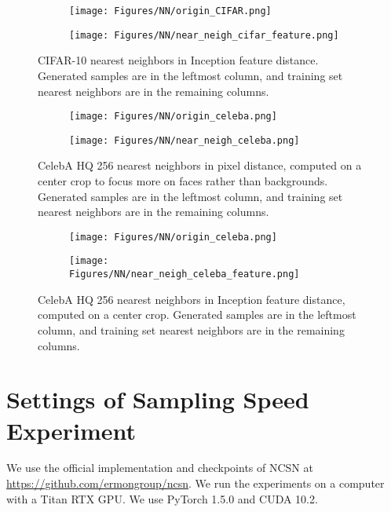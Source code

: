 \documentclass{article} \usepackage{iclr2021_conference,times}
\begin{document}
\begin{figure*}[ht]
    \centering
    \begin{subfigure}{.13\linewidth}
    \texttt{[image: Figures/NN/origin\_CIFAR.png]}
    \end{subfigure}
    \begin{subfigure}{.8\linewidth}
    \texttt{[image: Figures/NN/near\_neigh\_cifar\_feature.png]}
    \end{subfigure}
    \caption{\label{nn cifar feature}
    CIFAR-10 nearest neighbors in Inception feature distance. Generated samples are in the leftmost column, and training set nearest neighbors are in the remaining columns.}
\end{figure*}

\begin{figure*}[ht]
    \centering
    \begin{subfigure}{.09\linewidth}
    \texttt{[image: Figures/NN/origin\_celeba.png]}
    \end{subfigure}
    \begin{subfigure}{.9\linewidth}
    \texttt{[image: Figures/NN/near\_neigh\_celeba.png]}
    \end{subfigure}
    \caption{\label{nn celeba pixel}
     CelebA HQ 256 nearest neighbors in pixel distance, computed on a  center crop to focus more on faces rather than backgrounds. Generated samples are in the leftmost column, and training set nearest neighbors are in the
     remaining columns.}
\end{figure*}

\begin{figure*}[ht]
    \centering
    \begin{subfigure}{.09\linewidth}
    \texttt{[image: Figures/NN/origin\_celeba.png]}
    \end{subfigure}
    \begin{subfigure}{.9\linewidth}
    \texttt{[image: Figures/NN/near\_neigh\_celeba\_feature.png]}
    \end{subfigure}
    \caption{\label{nn celeba feature}
     CelebA HQ 256 nearest neighbors in Inception feature distance, computed on a  center crop. Generated samples are in the leftmost column, and training set nearest neighbors are in the
     remaining columns.}
\end{figure*}

\section{Settings of Sampling Speed Experiment}\label{sample speed}

We use the official implementation and checkpoints of NCSN at \url{https://github.com/ermongroup/ncsn}. We run the experiments on a computer with a Titan RTX GPU. We use PyTorch 1.5.0 and CUDA 10.2. 

 
\end{document}
